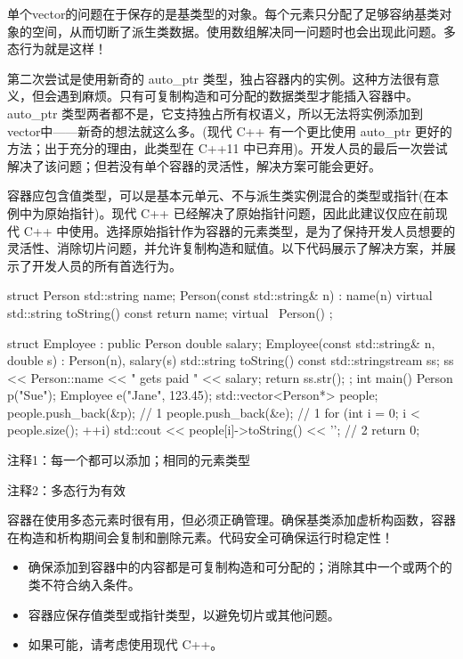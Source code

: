 单个vector的问题在于保存的是基类型的对象。每个元素只分配了足够容纳基类对象的空间，从而切断了派生类数据。使用数组解决同一问题时也会出现此问题。多态行为就是这样！

第二次尝试是使用新奇的 auto\_ptr 类型，独占容器内的实例。这种方法很有意义，但会遇到麻烦。只有可复制构造和可分配的数据类型才能插入容器中。auto\_ptr 类型两者都不是，它支持独占所有权语义，所以无法将实例添加到vector中——新奇的想法就这么多。(现代 C++ 有一个更比使用 auto\_ptr 更好的方法；出于充分的理由，此类型在 C++11 中已弃用)。开发人员的最后一次尝试解决了该问题；但若没有单个容器的灵活性，解决方案可能会更好。


容器应包含值类型，可以是基本元单元、不与派生类实例混合的类型或指针(在本例中为原始指针)。现代 C++ 已经解决了原始指针问题，因此此建议仅应在前现代 C++ 中使用。选择原始指针作为容器的元素类型，是为了保持开发人员想要的灵活性、消除切片问题，并允许复制构造和赋值。以下代码展示了解决方案，并展示了开发人员的所有首选行为。


\begin{cpp}
struct Person {
  std::string name;
  Person(const std::string& n) : name(n) {}
  virtual std::string toString() const { return name; }
  virtual ~Person() {}
};

struct Employee : public Person {
  double salary;
  Employee(const std::string& n, double s) : Person(n), salary(s) {}
  std::string toString() const {
    std::stringstream ss;
    ss << Person::name << " gets paid " << salary;
    return ss.str();
  }
};
int main() {
  Person p("Sue");
  Employee e("Jane", 123.45);
  std::vector<Person*> people;
  people.push_back(&p); // 1
  people.push_back(&e); // 1
  for (int i = 0; i < people.size(); ++i)
    std::cout << people[i]->toString() << '\n'; // 2
  return 0;
}
\end{cpp}

{\footnotesize
注释1：每一个都可以添加；相同的元素类型

注释2：多态行为有效
}

容器在使用多态元素时很有用，但必须正确管理。确保基类添加虚析构函数，容器在构造和析构期间会复制和删除元素。代码安全可确保运行时稳定性！


\begin{itemize}
\item
确保添加到容器中的内容都是可复制构造和可分配的；消除其中一个或两个的类不符合纳入条件。

\item
容器应保存值类型或指针类型，以避免切片或其他问题。

\item
如果可能，请考虑使用现代 C++。
\end{itemize}










